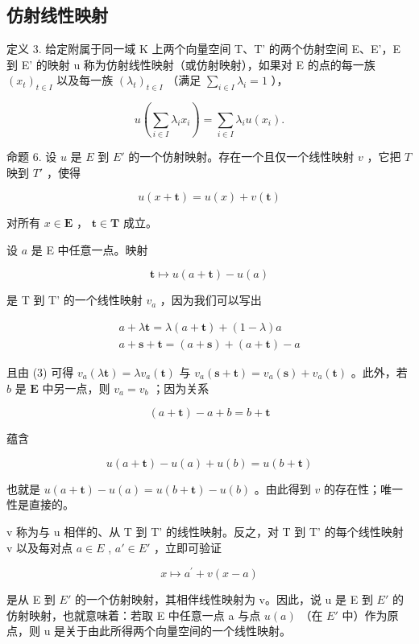 \subsection{仿射线性映射}

定义 3. 给定附属于同一域 K 上两个向量空间 T、T' 的两个仿射空间 E、E'，E 到 E' 的映射 u 称为仿射线性映射（或仿射映射），如果对 E 的点的每一族 \((x_{t})_{t\in I}\) 以及每一族 \((\lambda_{t})_{t\in I}\) （满足 \(\sum_{i\in I}\lambda_{i}=1\) ），

\[
u \left(\sum_ {i \in I} \lambda_ {i} x _ {i}\right) = \sum_ {i \in I} \lambda_ {i} u (x _ {i}).\tag{3}
\]

命题 6. 设 \(u\) 是 \(E\) 到 \(E'\) 的一个仿射映射。存在一个且仅一个线性映射 \(v\) ，它把 \(T\) 映到 \(T'\) ，使得

\[
u (x + \mathbf {t}) = u (x) + v (\mathbf {t})
\]

对所有 \(x \in \mathbf{E}\) ， \(\mathbf{t} \in \mathbf{T}\) 成立。

设 \(a\) 是 E 中任意一点。映射

\[
\mathbf {t} \mapsto u (a + \mathbf {t}) - u (a)
\]

是 T 到 T' 的一个线性映射 \(v_{a}\) ，因为我们可以写出

\[
\begin{array}{c} a + \lambda \mathbf {t} = \lambda (a + \mathbf {t}) + (1 - \lambda) a \\ a + \mathbf {s} + \mathbf {t} = (a + \mathbf {s}) + (a + \mathbf {t}) - a \end{array}
\]

且由 (3) 可得 \(v_{a}(\lambda \mathbf{t}) = \lambda v_{a}(\mathbf{t})\) 与 \(v_{a}(\mathbf{s} + \mathbf{t}) = v_{a}(\mathbf{s}) + v_{a}(\mathbf{t})\) 。此外，若 \(b\) 是 \(\mathbf{E}\) 中另一点，则 \(v_{a} = v_{b}\) ；因为关系

\[
(a + \mathbf {t}) - a + b = b + \mathbf {t}
\]

蕴含

\[
u (a + \mathbf {t}) - u (a) + u (b) = u (b + \mathbf {t})
\]

也就是 \(u(a + \mathbf{t}) - u(a) = u(b + \mathbf{t}) - u(b)\) 。由此得到 \(v\) 的存在性；唯一性是直接的。

v 称为与 u 相伴的、从 T 到 T' 的线性映射。反之，对 T 到 T' 的每个线性映射 v 以及每对点 \(a \in E\) , \(a' \in E'\) ，立即可验证

\[
x \mapsto a ^ {\prime} + v (x - a)
\]

是从 E 到 \(E'\) 的一个仿射映射，其相伴线性映射为 v。因此，说 u 是 E 到 \(E'\) 的仿射映射，也就意味着：若取 E 中任意一点 a 与点 \(u(a)\) （在 \(E'\) 中）作为原点，则 u 是关于由此所得两个向量空间的一个线性映射。

